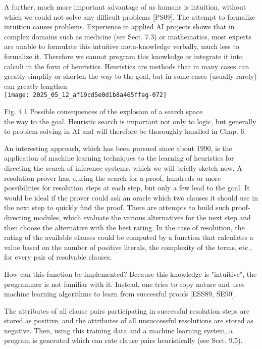 \documentclass[10pt]{article}
\begin{document}
A further, much more important advantage of us humans is intuition, without which we could not solve any difficult problems [PS09]. The attempt to formalize intuition causes problems. Experience in applied AI projects shows that in complex domains such as medicine (see Sect. 7.3) or mathematics, most experts are unable to formulate this intuitive meta-knowledge verbally, much less to formalize it. Therefore we cannot program this knowledge or integrate it into calculi in the form of heuristics. Heuristics are methods that in many cases can greatly simplify or shorten the way to the goal, but in some cases (usually rarely) can greatly lengthen\\
\texttt{[image: 2025\_05\_12\_af19cd5e0d1b8a465ffeg-072]}

Fig. 4.1 Possible consequences of the explosion of a search space\\
the way to the goal. Heuristic search is important not only to logic, but generally to problem solving in AI and will therefore be thoroughly handled in Chap. 6.

An interesting approach, which has been pursued since about 1990, is the application of machine learning techniques to the learning of heuristics for directing the search of inference systems, which we will briefly sketch now. A resolution prover has, during the search for a proof, hundreds or more possibilities for resolution steps at each step, but only a few lead to the goal. It would be ideal if the prover could ask an oracle which two clauses it should use in the next step to quickly find the proof. There are attempts to build such proof-directing modules, which evaluate the various alternatives for the next step and then choose the alternative with the best rating. In the case of resolution, the rating of the available clauses could be computed by a function that calculates a value based on the number of positive literals, the complexity of the terms, etc., for every pair of resolvable clauses.

How can this function be implemented? Because this knowledge is "intuitive", the programmer is not familiar with it. Instead, one tries to copy nature and uses machine learning algorithms to learn from successful proofs [ESS89, SE90].

The attributes of all clause pairs participating in successful resolution steps are stored as positive, and the attributes of all unsuccessful resolutions are stored as negative. Then, using this training data and a machine learning system, a program is generated which can rate clause pairs heuristically (see Sect. 9.5).
\end{document}
